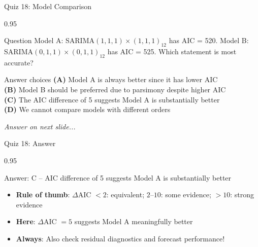 \documentclass[9pt, aspectratio=169, t]{beamer}
\begin{document}
\begin{frame}{Quiz 18: Model Comparison}
    \begin{cminipage}{0.95\textwidth}
    \begin{alertblock}{Question}
        Model A: SARIMA$(1,1,1) \times (1,1,1)_{12}$ has AIC = 520. Model B: SARIMA$(0,1,1) \times (0,1,1)_{12}$ has AIC = 525. Which statement is most accurate?
    \end{alertblock}

    \vspace{0.4cm}

    \begin{block}{Answer choices}
        \textcolor{MainBlue}{\textbf{(A)}} Model A is always better since it has lower AIC\\[3pt]
        \textcolor{MainBlue}{\textbf{(B)}} Model B should be preferred due to parsimony despite higher AIC\\[3pt]
        \textcolor{MainBlue}{\textbf{(C)}} The AIC difference of 5 suggests Model A is substantially better\\[3pt]
        \textcolor{MainBlue}{\textbf{(D)}} We cannot compare models with different orders
    \end{block}

    \vspace{0.5cm}

    \begin{center}
        \textit{Answer on next slide...}
    \end{center}
    \end{cminipage}
\end{frame}

\begin{frame}{Quiz 18: Answer}
    \begin{cminipage}{0.95\textwidth}
    \begin{exampleblock}{Answer: C -- AIC difference of 5 suggests Model A is substantially better}
        \begin{itemize}
            \item \textbf{Rule of thumb}: $\Delta$AIC $< 2$: equivalent; $2$--$10$: some evidence; $> 10$: strong evidence
            \item \textbf{Here}: $\Delta$AIC $= 5$ suggests Model A meaningfully better
            \item \textbf{Always}: Also check residual diagnostics and forecast performance!
        \end{itemize}
    \end{exampleblock}

    \end{cminipage}
\end{frame}
\end{document}

